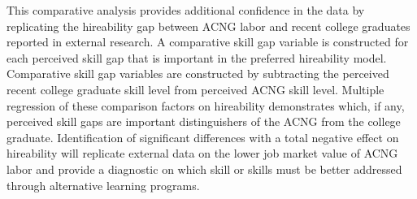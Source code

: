 \documentclass[review]{elsarticle}
\begin{document}
This comparative analysis provides additional confidence in the data by replicating the hireability gap between ACNG labor and recent college graduates reported in external research.
A comparative skill gap variable is constructed for each perceived skill gap that is important in the preferred hireability model.
Comparative skill gap variables are constructed by subtracting the perceived recent college graduate skill level from perceived ACNG skill level.
Multiple regression of these comparison factors on hireability demonstrates which, if any, perceived skill gaps are important distinguishers of the ACNG from the college graduate.
Identification of significant differences with a total negative effect on hireability will replicate external data on the lower job market value of ACNG labor
and provide a diagnostic on which skill or skills must be better addressed through alternative learning programs.


\end{document}
